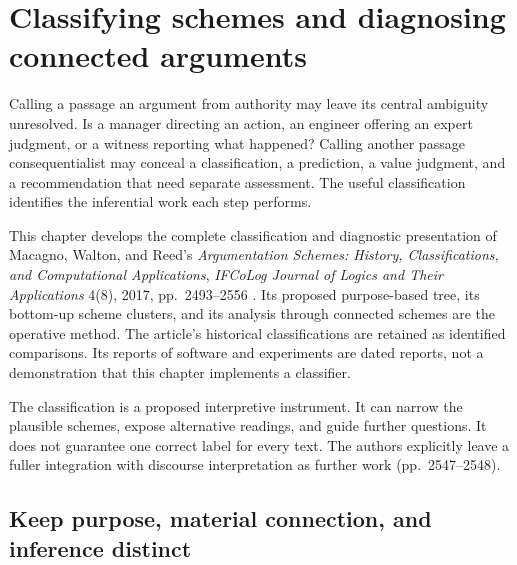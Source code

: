 \chapter{Classifying schemes and diagnosing connected arguments}
\label{sec:p18-scheme-classification-diagnosis}

Calling a passage an argument from authority may leave its central
ambiguity unresolved. Is a manager directing an action, an engineer
offering an expert judgment, or a witness reporting what happened?
Calling another passage consequentialist may conceal a classification,
a prediction, a value judgment, and a recommendation that need separate
assessment. The useful classification identifies the inferential work
each step performs.

This chapter develops the complete classification and diagnostic
presentation of Macagno, Walton, and Reed's \emph{Argumentation Schemes:
History, Classifications, and Computational Applications},
\emph{IFCoLog Journal of Logics and Their Applications} 4(8), 2017,
pp.~2493--2556 \cite{MacagnoWaltonReed2017Schemes}.
Its proposed purpose-based tree, its bottom-up scheme clusters, and
its analysis through connected schemes are the operative method.
The article's historical classifications are retained as identified
comparisons. Its reports of software and experiments are dated reports,
not a demonstration that this chapter implements a classifier.

The classification is a proposed interpretive instrument. It can narrow
the plausible schemes, expose alternative readings, and guide further
questions. It does not guarantee one correct label for every text.
The authors explicitly leave a fuller integration with discourse
interpretation as further work (pp.~2547--2548).

\section{Keep purpose, material connection, and inference distinct}
\label{sec:p18-scheme-dimensions}

